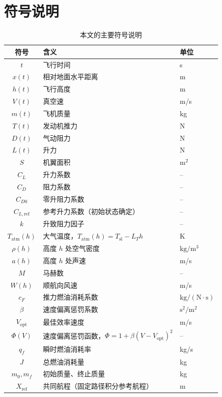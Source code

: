\documentclass[withoutpreface,bwprint]{cumcmthesis}
\begin{document}
\section{符号说明}

\begin{table}[htpb]
\centering
\caption{本文的主要符号说明}\label{tab:symbols}
\begin{tabular}{cll}\toprule
符号 & 含义 & 单位 \\
\midrule
$t$ & 飞行时间 & s \\
$x(t)$ & 相对地面水平距离 & m \\
$h(t)$ & 飞行高度 & m \\
$V(t)$ & 真空速 & m/s \\
$m(t)$ & 飞机质量 & kg \\
$T(t)$ & 发动机推力 & N \\
$D(t)$ & 气动阻力 & N \\
$L(t)$ & 升力 & N \\
$S$ & 机翼面积 & $\mathrm{m^2}$ \\
$C_L$ & 升力系数 & -- \\
$C_D$ & 阻力系数 & -- \\
$C_{D0}$ & 零升阻力系数 & -- \\
$C_{L,\mathrm{ref}}$ & 参考升力系数（初始状态确定） & -- \\
$k$ & 升致阻力因子 & -- \\
$T_{\mathrm{atm}}(h)$ & 大气温度，$T_{\mathrm{atm}}(h)=T_{\mathrm{sl}}-L_T h$ & K \\
$\rho(h)$ & 高度 $h$ 处空气密度 & $\mathrm{kg/m^3}$ \\
$a(h)$ & 高度 $h$ 处声速 & m/s \\
$M$ & 马赫数 & -- \\
$W(h)$ & 顺航向风速 & m/s \\
$c_F$ & 推力燃油消耗系数 & $\mathrm{kg/(N\cdot s)}$ \\
$\beta$ & 速度偏离惩罚系数 & $\mathrm{s^2/m^2}$ \\
$V_{\mathrm{opt}}$ & 最佳效率速度 & m/s \\
$\Phi(V)$ & 速度偏离惩罚函数，$\Phi=1+\beta(V-V_{\mathrm{opt}})^2$ & -- \\
$q_f$ & 瞬时燃油消耗率 & kg/s \\
$J$ & 总燃油消耗量 & kg \\
$m_0,m_f$ & 初始质量、终止质量 & kg \\
$X_{\mathrm{ref}}$ & 共同航程（固定路径积分参考航程） & m \\

\bottomrule
\end{tabular}
\end{table}
\end{document}
